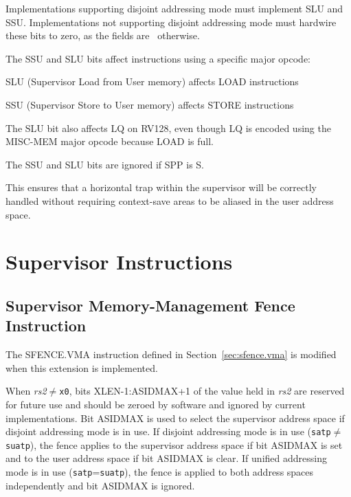 Implementations supporting disjoint addressing mode must implement SLU and
SSU.  Implementations not supporting disjoint addressing mode must hardwire
these bits to zero, as the fields are \wpri\ otherwise.

The SSU and SLU bits affect instructions using a specific major opcode:
\begin{compactitem}
\item SLU (Supervisor Load from User memory) affects LOAD instructions
\item SSU (Supervisor Store to User memory) affects STORE instructions
\end{compactitem}

The SLU bit also affects LQ on RV128, even though LQ is encoded using the
MISC-MEM major opcode because LOAD is full.

The SSU and SLU bits are ignored if SPP is S.

\begin{commentary}
This ensures that a horizontal trap within the supervisor will be correctly
handled without requiring context-save areas to be aliased in the user
address space.
\end{commentary}

\section {Supervisor Instructions}

\subsection{Supervisor Memory-Management Fence Instruction}
\label{s:das:sfence.vma}

The SFENCE.VMA instruction defined in Section~\ref{sec:sfence.vma} is
modified when this extension is implemented.

When {\em rs2}$\neq${\tt x0}, bits XLEN-1:ASIDMAX+1 of the value held in
{\em rs2} are reserved for future use and should be zeroed by software and
ignored by current implementations.  Bit ASIDMAX is used to select the
supervisor address space if disjoint addressing mode is in use.  If
disjoint addressing mode is in use ({\tt satp}$\neq${\tt suatp}), the fence
applies to the supervisor address space if bit ASIDMAX is set and to the
user address space if bit ASIDMAX is clear.  If unified addressing mode is
in use ({\tt satp}={\tt suatp}), the fence is applied to both address
spaces independently and bit ASIDMAX is ignored.

